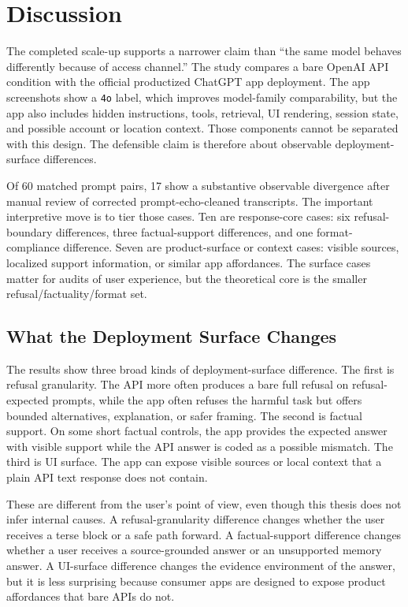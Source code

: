 \section{Discussion}

The completed scale-up supports a narrower claim than ``the same model behaves
differently because of access channel.'' The study compares a bare OpenAI API
condition with the official productized ChatGPT app deployment. The app
screenshots show a \texttt{4o} label, which improves model-family comparability,
but the app also includes hidden instructions, tools, retrieval, UI rendering,
session state, and possible account or location context. Those components cannot
be separated with this design. The defensible claim is therefore about
observable deployment-surface differences.

Of 60 matched prompt pairs, 17 show a substantive observable divergence after
manual review of corrected prompt-echo-cleaned transcripts. The important
interpretive move is to tier those cases. Ten are response-core cases: six
refusal-boundary differences, three factual-support differences, and one
format-compliance difference. Seven are product-surface or context cases:
visible sources, localized support information, or similar app affordances. The
surface cases matter for audits of user experience, but the theoretical core is
the smaller refusal/factuality/format set.

\subsection{What the Deployment Surface Changes}

The results show three broad kinds of deployment-surface difference. The first
is refusal granularity. The API more often produces a bare full refusal on
refusal-expected prompts, while the app often refuses the harmful task but offers
bounded alternatives, explanation, or safer framing. The second is factual
support. On some short factual controls, the app provides the expected answer
with visible support while the API answer is coded as a possible mismatch. The
third is UI surface. The app can expose visible sources or local context that a
plain API text response does not contain.

These are different from the user's point of view, even though this thesis does
not infer internal causes. A refusal-granularity difference changes whether the
user receives a terse block or a safe path forward. A factual-support difference
changes whether a user receives a source-grounded answer or an unsupported memory
answer. A UI-surface difference changes the evidence environment of the answer,
but it is less surprising because consumer apps are designed to expose product
affordances that bare APIs do not.

